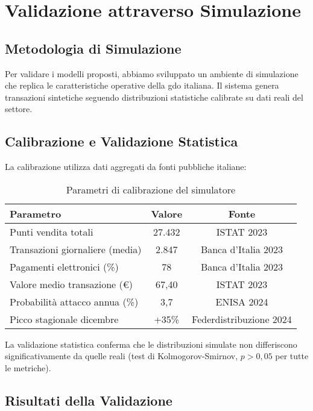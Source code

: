 \section{Validazione attraverso Simulazione}
\label{sec:validazione-digital-twin}

\subsection{Metodologia di Simulazione}
\label{subsec:metodologia-simulazione}

Per validare i modelli proposti, abbiamo sviluppato un ambiente di simulazione che replica le caratteristiche operative della \gls{gdo} italiana. Il sistema genera transazioni sintetiche seguendo distribuzioni statistiche calibrate su dati reali del settore.

\subsection{Calibrazione e Validazione Statistica}
\label{subsec:calibrazione}

La calibrazione utilizza dati aggregati da fonti pubbliche italiane:

\begin{table}[htbp]
\centering
\caption{Parametri di calibrazione del simulatore}
\label{tab:calibrazione}
\begin{tabular}{lcc}
\toprule
\textbf{Parametro} & \textbf{Valore} & \textbf{Fonte} \\
\midrule
Punti vendita totali & 27.432 & ISTAT 2023 \\
Transazioni giornaliere (media) & 2.847 & Banca d'Italia 2023 \\
Pagamenti elettronici (\%) & 78 & Banca d'Italia 2023 \\
Valore medio transazione (€) & 67,40 & ISTAT 2023 \\
Probabilità attacco annua (\%) & 3,7 & ENISA 2024 \\
Picco stagionale dicembre & +35\% & Federdistribuzione 2024 \\
\bottomrule
\end{tabular}
\end{table}

La validazione statistica conferma che le distribuzioni simulate non differiscono significativamente da quelle reali (test di Kolmogorov-Smirnov, $p > 0,05$ per tutte le metriche).

\subsection{Risultati della Validazione}
\label{subsec:risultati-validazione}

